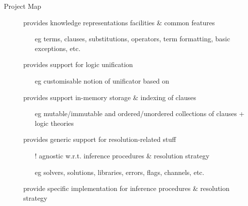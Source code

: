 \documentclass[handout]{beamer}
\begin{document}
\begin{frame}[allowframebreaks]{Project Map}
    \framebreak

    \begin{description}
        \item[] provides \alert{knowledge representations} facilities \& common features
        \begin{itemize}\small
            \item[eg] terms, clauses, substitutions, operators, term formatting, basic exceptions, etc.
        \end{itemize}

        \medskip

        \item[] provides support for \alert{logic unification}
        \begin{itemize}\small
            \item[eg] customisable notion of unificator based on \cite{MartelliMontanari1982}
        \end{itemize}

        \medskip

        \item[] provides support in-memory \alert{storage \& indexing} of clauses
        \begin{itemize}\small
            \item[eg] mutable/immutable and ordered/unordered \alert{collections of clauses} + \alert{logic theories}
        \end{itemize}

        \medskip

        \item[] provides generic support for \alert{resolution-related} stuff
        \begin{itemize}\small
            \item[!] agnostic w.r.t. inference procedures \& resolution strategy
            \item[eg] solvers, solutions, libraries, errors, flags, channels, etc.
        \end{itemize}

        \framebreak

        \item[] provide specific implementation for inference procedures \& \alert{resolution} strategy


\end{description}
\end{frame}
\end{document}
